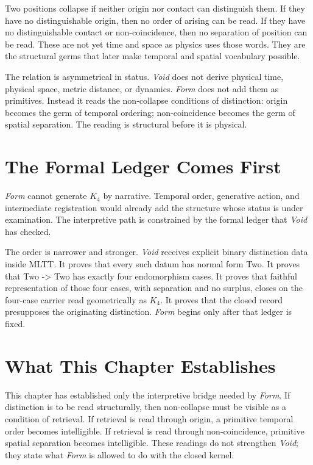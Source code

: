 \documentclass[11pt,a4paper]{book}
\def\texttt#1{#1}%
\begin{document}
Two positions collapse if neither origin nor contact can distinguish them. If they have no distinguishable origin, then no order of arising can be read. If they have no distinguishable contact or non-coincidence, then no separation of position can be read. These are not yet time and space as physics uses those words. They are the structural germs that later make temporal and spatial vocabulary possible.

The relation is asymmetrical in status. \textit{Void} does not derive physical time, physical space, metric distance, or dynamics. \textit{Form} does not add them as primitives. Instead it reads the non-collapse conditions of distinction: origin becomes the germ of temporal ordering; non-coincidence becomes the germ of spatial separation. The reading is structural before it is physical.

\section*{The Formal Ledger Comes First}

\textit{Form} cannot generate $K_4$ by narrative. Temporal order, generative action, and intermediate registration would already add the structure whose status is under examination. The interpretive path is constrained by the formal ledger that \textit{Void} has checked.

The order is narrower and stronger. \textit{Void} receives explicit binary distinction data inside MLTT. It proves that every such datum has normal form \texttt{Two}. It proves that \texttt{Two -> Two} has exactly four endomorphism cases. It proves that faithful representation of those four cases, with separation and no surplus, closes on the four-case carrier read geometrically as $K_4$. It proves that the closed record presupposes the originating distinction. \textit{Form} begins only after that ledger is fixed.

\section*{What This Chapter Establishes}

This chapter has established only the interpretive bridge needed by \textit{Form}. If distinction is to be read structurally, then non-collapse must be visible as a condition of retrieval. If retrieval is read through origin, a primitive temporal order becomes intelligible. If retrieval is read through non-coincidence, primitive spatial separation becomes intelligible. These readings do not strengthen \textit{Void}; they state what \textit{Form} is allowed to do with the closed kernel.
\end{document}

